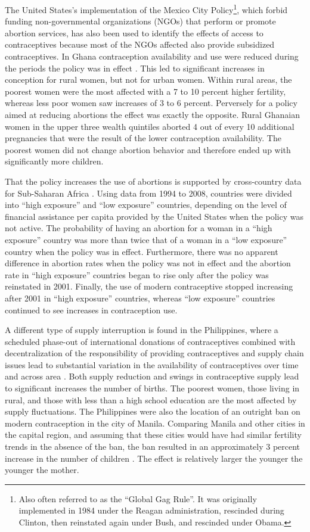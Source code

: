 \documentclass[]{article}
\begin{document}
The United States's implementation of the Mexico City Policy\footnote{Also often referred to as the ``Global Gag Rule''. It was originally implemented in 1984 under the Reagan administration, rescinded during Clinton, then reinstated again under Bush, and rescinded under Obama.}, which forbid funding non-governmental organizations (NGOs) that perform or promote abortion services, has also been used to identify the effects of access to contraceptives because most of the NGOs affected also provide subsidized contraceptives. In Ghana contraception availability and use were reduced during the periods the policy was in effect \citep{Jones2015}. This led to significant increases in conception for rural women, but not for urban women. Within rural areas, the poorest women were the most affected with a 7 to 10 percent higher fertility, whereas less poor women saw increases of 3 to 6 percent. Perversely for a policy aimed at reducing abortions the effect was exactly the opposite. Rural Ghanaian women in the upper three wealth quintiles aborted 4 out of every 10 additional pregnancies that were the result of the lower contraception availability. The poorest women did not change abortion behavior and therefore ended up with significantly more children.

That the policy increases the use of abortions is supported by cross-country data for Sub-Saharan Africa \citep{Bendavid2011}. Using data from 1994 to 2008, countries were divided into ``high exposure'' and ``low exposure'' countries, depending on the level of financial assistance per capita provided by the United States when the policy was not active. The probability of having an abortion for a woman in a ``high exposure'' country was more than twice that of a woman in a ``low exposure'' country when the policy was in effect. Furthermore, there was no apparent difference in abortion rates when the policy was not in effect and the abortion rate in ``high exposure'' countries began to rise only after the policy was reinstated in 2001. Finally, the use of modern contraceptive stopped increasing after 2001 in ``high exposure'' countries, whereas ``low exposure'' countries continued to see increases in contraception use.

A different type of supply interruption is found in the Philippines, where a scheduled phase-out of international donations of contraceptives combined with decentralization of the responsibility of providing contraceptives and supply chain issues lead to substantial variation in the availability of contraceptives over time and across area \citep{Salas2014}. Both supply reduction and swings in contraceptive supply lead to significant increases the number of births. The poorest women, those living in rural, and those with less than a high school education are the most affected by supply fluctuations. The Philippines were also the location of an outright ban on modern contraception in the city of Manila. Comparing Manila and other cities in the capital region, and assuming that these cities would have had similar fertility trends in the absence of the ban, the ban resulted in an approximately 3 percent increase in the number of children \citep{Dumas2017}. The effect is relatively larger the younger the younger the mother.
\end{document}
